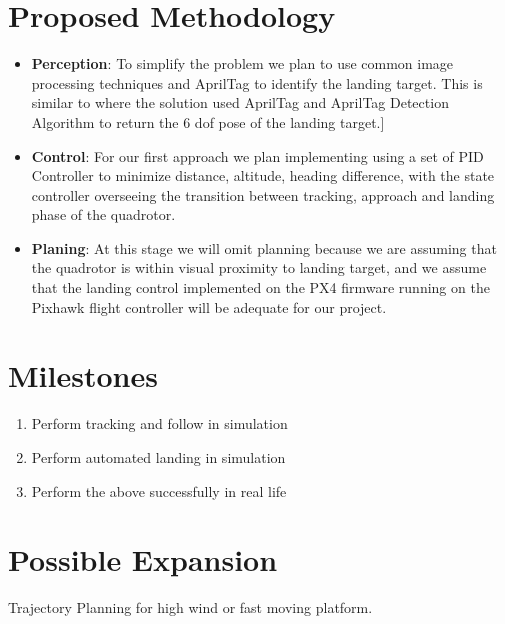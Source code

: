 \documentclass{article}
\begin{document}
\section*{Proposed Methodology}

\begin{itemize}
	\vspace{-0.2cm}
	\setlength{\itemsep}{5pt}
	\setlength{\parskip}{0pt}
	\setlength{\parsep}{0pt}

	\item{\textbf{Perception}: To simplify the problem we plan to use common image processing techniques and AprilTag to identify the landing target. This is similar to \cite{Ling2014} where the solution used AprilTag and AprilTag Detection Algorithm to return the 6 dof pose of the landing target.}]
	
	\item{\textbf{Control}: For our first approach we plan implementing using a set of PID Controller to minimize distance, altitude, heading difference, with the state controller overseeing the transition between tracking, approach and landing phase of the quadrotor.}
	
	\item{\textbf{Planing}: At this stage we will omit planning because we are assuming that the quadrotor is within visual proximity to landing target, and we assume that the landing control implemented on the PX4 firmware \cite{px4} running on the Pixhawk flight controller \cite{pixhawk} will be adequate for our project.}
	
	\vspace{-0.2cm}
\end{itemize}




\section*{Milestones}
\begin{enumerate}
	\item{Perform tracking and follow in simulation}
	\item{Perform automated landing in simulation}
	\item{Perform the above successfully in real life}
\end{enumerate}


\section*{Possible Expansion}

Trajectory Planning for high wind or fast moving platform.



{}

\end{document}
